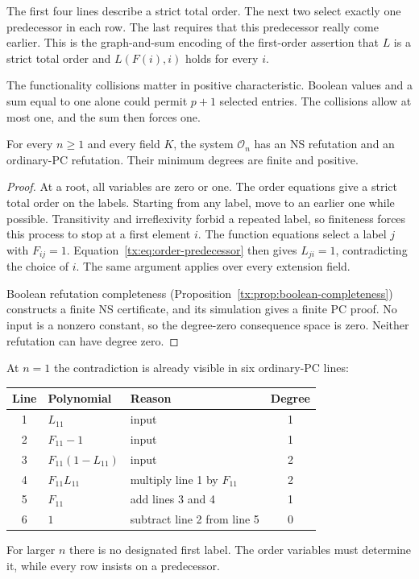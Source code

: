 The first four lines describe a strict total order. The next two select
exactly one predecessor in each row. The last requires that this
predecessor really come earlier. This is the graph-and-sum encoding of
the first-order assertion that $L$ is a strict total order and
$L(F(i),i)$ holds for every $i$.

The functionality collisions matter in positive characteristic.
Boolean values and a sum equal to one alone could permit $p+1$ selected
entries. The collisions allow at most one, and the sum then forces one.

\begin{proposition}
\label{tx:prop:order-finite}
For every $n\ge1$ and every field $K$, the system $\mathcal O_n$ has
an NS refutation and an ordinary-PC refutation. Their minimum degrees
are finite and positive.
\end{proposition}
\begin{proof}
At a root, all variables are zero or one. The order equations give a
strict total order on the labels. Starting from any label, move to an
earlier one while possible. Transitivity and irreflexivity forbid a
repeated label, so finiteness forces this process to stop at a first
element $i$.
The function equations select a label $j$ with $F_{ij}=1$.
Equation~\eqref{tx:eq:order-predecessor} then gives $L_{ji}=1$,
contradicting the choice of $i$. The same argument applies over every
extension field.

Boolean refutation completeness
(Proposition~\ref{tx:prop:boolean-completeness}) constructs a finite
NS certificate, and its simulation gives a finite PC proof. No input
is a nonzero constant, so the degree-zero consequence space is zero.
Neither refutation can have degree zero.
\end{proof}

At $n=1$ the contradiction is already visible in six ordinary-PC lines:
\begin{center}
\begin{tabular}{@{}cllc@{}}
\toprule
Line & Polynomial & Reason & Degree\\
\midrule
1 & $L_{11}$ & input & 1\\
2 & $F_{11}-1$ & input & 1\\
3 & $F_{11}(1-L_{11})$ & input & 2\\
4 & $F_{11}L_{11}$ & multiply line 1 by $F_{11}$ & 2\\
5 & $F_{11}$ & add lines 3 and 4 & 1\\
6 & $1$ & subtract line 2 from line 5 & 0\\
\bottomrule
\end{tabular}
\end{center}
For larger $n$ there is no designated first label. The order variables
must determine it, while every row insists on a predecessor.

